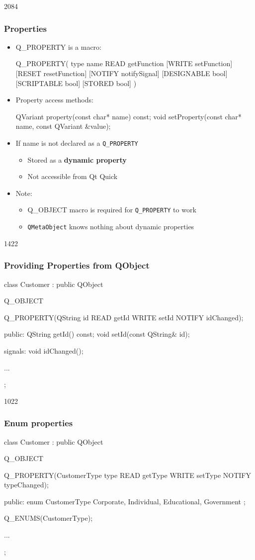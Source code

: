 \begin{slide}[fragile]{2084}
\frametitle{Properties}
\begin{itemize}
  \item Q\_PROPERTY is a macro:
\begin{cpp}
  Q_PROPERTY( type name READ getFunction [WRITE setFunction]
  [RESET resetFunction] [NOTIFY notifySignal] [DESIGNABLE bool]
  [SCRIPTABLE bool] [STORED bool] )
\end{cpp}
  \medskip
  \item Property access methods:
\begin{cpp}
  QVariant property(const char* name) const;
  void setProperty(const char* name, const QVariant &value);
\end{cpp}
  \medskip
  \item If name is not declared as a \texttt{Q\_PROPERTY}
  \begin{itemize}
    \item Stored as a \textbf{dynamic property}
    \item Not accessible from Qt Quick
  \end{itemize}
  \medskip
  \item Note:
  \begin{itemize}
    \item Q\_OBJECT macro is required for \texttt{Q\_PROPERTY} to work
    \item \texttt{QMetaObject} knows nothing about dynamic properties
  \end{itemize}
\end{itemize}
\end{slide}

\begin{slide}[fragile]{1422}
\frametitle{Providing Properties from QObject}
\begin{cpp}
class Customer : public QObject
{
    Q_OBJECT

    Q_PROPERTY(QString id READ getId WRITE setId NOTIFY idChanged);

  public:
     QString getId() const;
     void setId(const QString& id);
  
  signals:
     void idChanged();

  ...
};
\end{cpp}
\end{slide}

\begin{slide}[fragile]{1022}
\frametitle{Enum properties}
\begin{cpp}
class Customer : public QObject
{
    Q_OBJECT

    Q_PROPERTY(CustomerType type READ getType WRITE setType 
               NOTIFY typeChanged);

  public:
    enum CustomerType {
      Corporate, Individual, Educational, Government
    };

    Q_ENUMS(CustomerType);
    
  ...
};
\end{cpp}
\end{slide}

